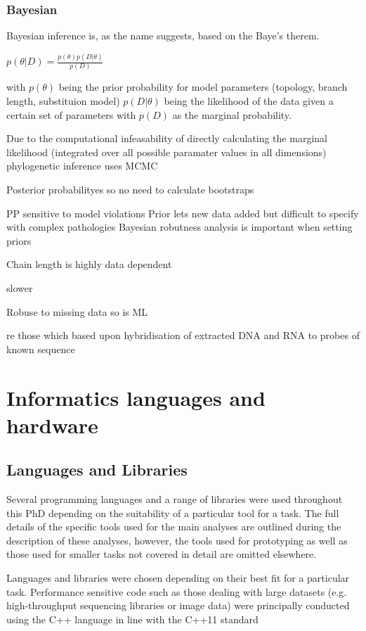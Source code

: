 \subsubsection{Bayesian}

Bayesian inference is, as the name suggests, based on the Baye's therem.

\(p(\theta | D) = \frac{p(\theta)p(D|\theta)}{p(D)}\)

with \(p(\theta)\) being the prior probability for model parameters (topology, branch length, substituion model)
\(p(D|\theta)\) being the likelihood of the data given a certain set of parameters with \(p(D)\) as the marginal 
probability.

Due to the computational infeasability of directly calculating the marginal likelihood (integrated over all possible
paramater values in all dimensions) phylogenetic inference uses MCMC 


Posterior probabilityes so no need to calculate bootstraps 

PP sensitive to model violations
Prior lets new data added  but difficult to specify with complex pathologies 
Bayesian robutness analysis is important when setting priors 

Chain length is highly data dependent

slower


Robuse to missing data \citep{Wiens2008} so is ML


re those which based upon  
hybridisation of extracted DNA and RNA to probes of known sequence 





\section{Informatics languages and hardware}

\subsection{Languages and Libraries} 
Several programming languages and a range of libraries were used throughout this PhD depending
on the suitability of a particular tool for a task.
The full details of the specific tools used for the main analyses are outlined during the description
of these analyses, however, the tools used for prototyping as well as those used for smaller tasks not covered
in detail are omitted elsewhere. 

Languages and libraries were chosen depending on their best fit for a particular task.
Performance sensitive code such as those dealing with large datasets (e.g. high-throughput sequencing 
libraries or image data) were principally conducted using the C++ language 
in line with the C++11 standard \citep{ISOInternationalStandard2011}

